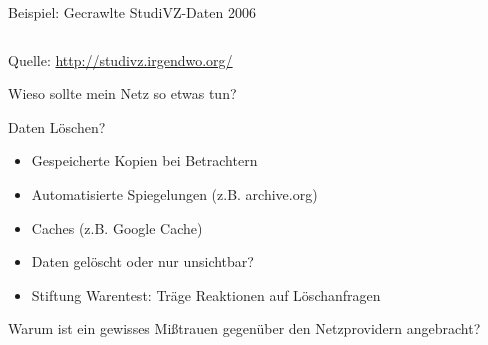 \begin{frame}{Beispiel: Gecrawlte StudiVZ-Daten 2006}
	\begin{columns}
	\end{columns}
	\vfill
	{\tiny Quelle: \url{http://studivz.irgendwo.org/}}
\end{frame}

\begin{frame}{Wieso sollte mein Netz so etwas tun?}
\end{frame}

\begin{frame}{Daten Löschen?}
	\begin{itemize}
		\item Gespeicherte Kopien bei Betrachtern
		\item Automatisierte Spiegelungen (z.B. archive.org)
		\item Caches (z.B. Google Cache)
		\item Daten gelöscht oder nur unsichtbar?
		\item Stiftung Warentest: Träge Reaktionen auf Löschanfragen
	\end{itemize}
\end{frame}

\begin{frame}{Warum ist ein gewisses Mißtrauen gegenüber den Netzprovidern angebracht?}
\end{frame}


